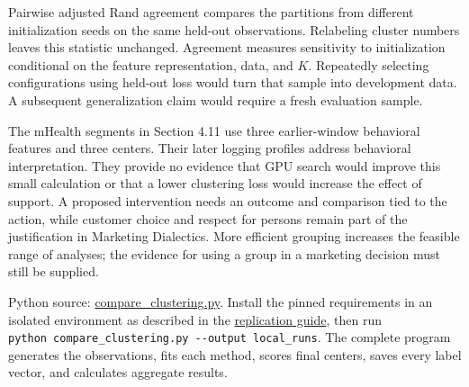 Pairwise adjusted Rand agreement compares the partitions from different
initialization seeds on the same held-out observations. Relabeling
cluster numbers leaves this statistic unchanged. Agreement measures
sensitivity to initialization conditional on the feature representation,
data, and \(K\). Repeatedly selecting configurations using held-out loss
would turn that sample into development data. A subsequent
generalization claim would require a fresh evaluation sample.

The mHealth segments in Section 4.11 use three earlier-window behavioral
features and three centers. Their later logging profiles address
behavioral interpretation. They provide no evidence that GPU search
would improve this small calculation or that a lower clustering loss
would increase the effect of support. A proposed intervention needs an
outcome and comparison tied to the action, while customer choice and
respect for persons remain part of the justification in Marketing
Dialectics. More efficient grouping increases the feasible range of
analyses; the evidence for using a group in a marketing decision must
still be supplied.

\FloatBarrier
{}
Python source:
\href{../03_Data_and_Code/Clustering_Optimization/compare_clustering.py}{compare\_clustering.py}.
Install the pinned requirements in an isolated environment as described
in the
\href{../03_Data_and_Code/Clustering_Optimization/README.md}{replication
guide}, then run
\texttt{python\ compare\_clustering.py\ -\/-output\ local\_runs}. The
complete program generates the observations, fits each method, scores
final centers, saves every label vector, and calculates aggregate
results.

